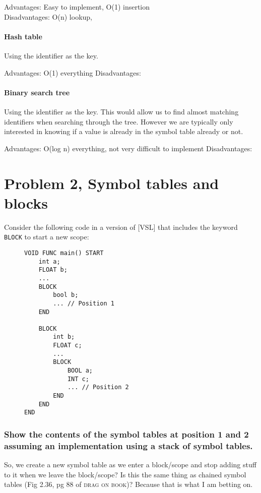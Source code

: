 Advantages: Easy to implement, O(1) insertion\\
Disadvantages: O(n) lookup, 


\paragraph{Hash table}
Using the identifier as the key.

Advantages: O(1) everything
Disadvantages: 

\paragraph{Binary search tree}
Using the identifier as the key.
This would allow us to find almost matching identifiers when searching through the tree.
However we are typically only interested in knowing if a value is already in the symbol table already or not.

Advantages: O(log n) everything, not very difficult to implement
Disadvantages: 

\newpage
\setcounter{subsubsection}{0}
\section{Problem 2, Symbol tables and blocks}
Consider the following code in a version of [VSL] that includes the keyword \texttt{BLOCK} to start a new scope:
\begin{figure}[H]
\begin{verbatim}
VOID FUNC main() START
    int a;
    FLOAT b;
    ...
    BLOCK
        bool b;
        ... // Position 1
    END

    BLOCK
        int b;
        FLOAT c;
        ...
        BLOCK
            BOOL a;
            INT c;
            ... // Position 2
        END
    END
END
\end{verbatim}
\end{figure}

\subsubsection{Show the contents of the symbol tables at position 1 and 2 assuming an implementation using a stack of symbol tables.}
So, we create a new symbol table as we enter a block/scope and stop adding stuff to it when we leave the block/scope?
Is this the same thing as chained symbol tables (Fig 2.36, pg 88 of \textsc{drag on book})?
Because that is what I am betting on.


